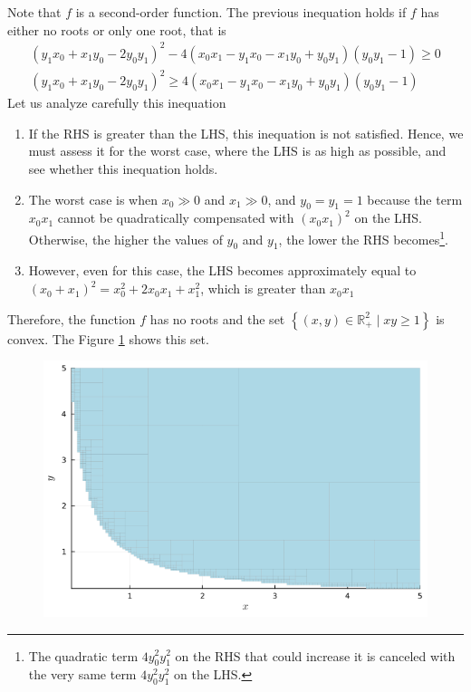 \documentclass[12pt,a4paper]{article}
\begin{document}
Note that \(f\) is a second-order function. The previous inequation holds if \(f\) has either no roots or only one root, that is
\begin{align}
    (y_1 x_0 + x_1 y_0 - 2y_0 y_1)^2 - 4(x_0 x_1 - y_1 x_0 - x_1 y_0 + y_0 y_1 )(y_0 y_1 - 1) \geq 0 \\
    (y_1 x_0 + x_1 y_0 - 2y_0 y_1)^2 \geq 4(x_0 x_1 - y_1 x_0 - x_1 y_0 + y_0 y_1 )(y_0 y_1 - 1)
\end{align}
Let us analyze carefully this inequation
\begin{enumerate}
    \item If the RHS is greater than the LHS, this inequation is not satisfied. Hence, we must assess it for the worst case, where the LHS is as high as possible, and see whether this inequation holds.
    \item The worst case is when \(x_0 \gg 0\) and \(x_1 \gg 0\), and \(y_0=y_1=1\) because the term \(x_0 x_1\) cannot be quadratically compensated with \((x_0 x_1)^2\) on the LHS. Otherwise, the higher the values of \(y_0\) and \(y_1\), the lower the RHS becomes\footnote{The quadratic term \(4y_0^2 y_1^2\) on the RHS that could increase it is canceled with the very same term \(4y_0^2 y_1^2\) on the LHS.}.
    \item However, even for this case, the LHS becomes approximately equal to \((x_0 + x_1)^2 = x_0^2 + 2x_0x_1 + x_1^2\), which is greater than \(x_0x_1\)
\end{enumerate}

Therefore, the function \(f\) has no roots and the set \(\left\{ (x,y) \in \mathbb{R}_{+}^{2} \mid xy \geq 1 \right\}\) is convex. The Figure \ref{fig:28d} shows this set.
\begin{figure}[H]
    \centering
    \includegraphics[scale=0.4]{figs/2.8d.png}
    \label{fig:28d}
\end{figure}
\end{document}
